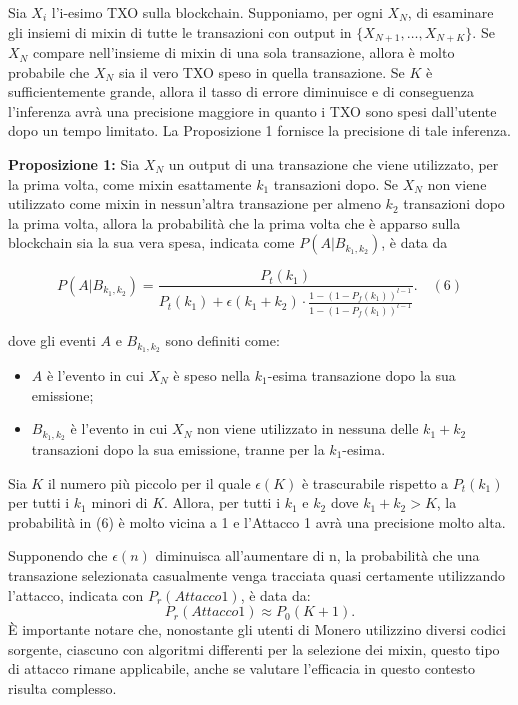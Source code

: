 Sia \( X_i \) l'i-esimo TXO sulla blockchain. Supponiamo, per ogni \( X_N \), di esaminare gli insiemi di mixin di tutte le transazioni con output in \( \{X_{N+1}, \dots, X_{N+K}\} \). Se \( X_N \) compare nell'insieme di mixin di una sola transazione, allora è molto probabile che \( X_N \) sia il vero TXO speso in quella transazione. Se \( K \) è sufficientemente grande, allora il tasso di errore diminuisce e di conseguenza l'inferenza avrà una precisione maggiore in quanto i TXO sono spesi dall'utente dopo un tempo limitato. La Proposizione 1 fornisce la precisione di tale inferenza.

\textbf{Proposizione 1:} Sia \( X_N \) un output di una transazione che viene utilizzato, per la prima volta, come mixin esattamente \( k_1 \) transazioni dopo. Se \( X_N \) non viene utilizzato come mixin in nessun'altra transazione per almeno \( k_2 \) transazioni dopo la prima volta, allora la probabilità che la prima volta che è apparso sulla blockchain sia la sua vera spesa, indicata come \( P(A|B_{k_1,k_2}) \), è data da

\[ P(A|B_{k_1,k_2}) = \frac{P_t(k_1)}{P_t(k_1) + \epsilon(k_1 + k_2) \cdot \frac{1 - (1 - P_f(k_1))^{l-1}}{1 - (1 - P_f(k_1))^{l-1}}}. \quad (6) \]

dove gli eventi \( A \) e \( B_{k_1,k_2} \) sono definiti come:

\begin{itemize}
    \item \( A \) è l'evento in cui \( X_N \) è speso nella \( k_1 \)-esima transazione dopo la sua emissione;
    \item \( B_{k_1,k_2} \) è l'evento in cui \( X_N \) non viene utilizzato in nessuna delle \( k_1 + k_2 \) transazioni dopo la sua emissione, tranne per la \( k_1 \)-esima.
\end{itemize}

Sia \( K \) il numero più piccolo per il quale \( \epsilon(K) \) è trascurabile rispetto a \( P_t(k_1) \) per tutti i \( k_1 \) minori di \( K \). Allora, per tutti i \( k_1 \) e \( k_2 \) dove \( k_1 + k_2 > K \), la probabilità in (6) è molto vicina a 1 e l'Attacco 1 avrà una precisione molto alta.

Supponendo che $\epsilon(n)$ diminuisca all'aumentare di n, la probabilità che una transazione selezionata casualmente venga tracciata quasi certamente utilizzando l'attacco, indicata con $P_{r}(Attacco 1)$, è data da:
\begin{equation}
    P_{r}(Attacco 1) \approx P_{0}(K+1).
\end{equation}
È importante notare che, nonostante gli utenti di Monero utilizzino diversi codici sorgente, ciascuno con algoritmi differenti per la selezione dei mixin, questo tipo di attacco rimane applicabile, anche se valutare l'efficacia in questo contesto risulta complesso.